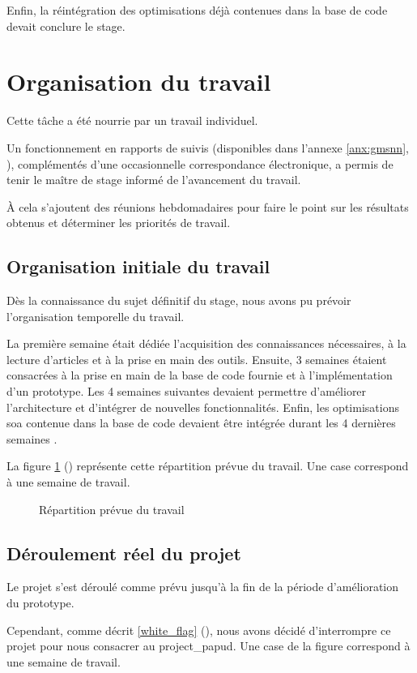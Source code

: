 Enfin, la réintégration des optimisations déjà contenues dans la base de code devait conclure le stage.

\section{Organisation du travail}
Cette tâche a été nourrie par un travail individuel.

Un fonctionnement en rapports de suivis (disponibles dans l'annexe \ref{anx:gmsnn}, ), complémentés d'une occasionnelle correspondance électronique, a permis de tenir le maître de stage informé de l'avancement du travail.

À cela s'ajoutent des réunions hebdomadaires pour faire le point sur les résultats obtenus et déterminer les priorités de travail.

\subsection{Organisation initiale du travail}
Dès la connaissance du sujet définitif du stage, 
nous avons pu prévoir l'organisation temporelle du travail.

La première semaine était dédiée l'acquisition des connaissances nécessaires, à la lecture d'articles et à la prise en main des outils.
Ensuite, 3 semaines étaient consacrées à la prise en main de la base de code fournie et à l'implémentation d'un prototype.
Les 4 semaines suivantes devaient permettre d'améliorer l'architecture et d'intégrer de nouvelles fonctionnalités.
Enfin, les optimisations \gls{soa} contenue dans la base de code devaient être intégrée durant les 4 dernières semaines .

La figure \ref{fig:gmsnn_time_1} () représente cette répartition prévue du travail.
Une case correspond à une semaine de travail.
\begin{figure}[ht]
	\centering
	\caption[Répartition prévue du travail]{Répartition prévue du travail}\label{fig:gmsnn_time_1}
\end{figure}

\subsection{Déroulement réel du projet}
Le projet s'est déroulé comme prévu jusqu'à la fin de la période d'amélioration du prototype.

Cependant, comme décrit \autoref{white_flag} (), nous avons décidé d'interrompre ce projet pour nous consacrer au \gls{project_papud}. Une case de la figure correspond à une semaine de travail.

